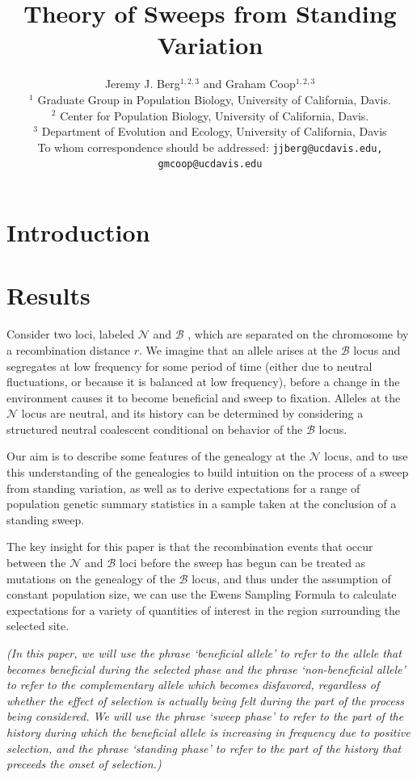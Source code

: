 \documentclass[a4paper,10pt]{article}
\title{Theory of Sweeps from Standing Variation}
\author{
Jeremy J. Berg$^{1,2,3}$ and Graham Coop$^{1,2,3}$ \\
$^1$ Graduate Group in Population Biology, University of California, Davis. \\
$^2$ Center for Population Biology, University of California, Davis.\\
$^3$ Department of Evolution and Ecology, University of California, Davis\\
\small To whom correspondence should be addressed: \texttt{jjberg@ucdavis.edu, gmcoop@ucdavis.edu}\\
}
\date{}
\newcommand{\fancyN}{$\mathcal N$ }
\newcommand{\fancyB}{$\mathcal B$ }
\newcommand{\jb}[1]{{\it\color{blue} (#1)} }
\begin{document}
\maketitle

\begin{abstract}
\end{abstract}

\section{Introduction}



\section{Results}
Consider two loci, labeled \fancyN and \fancyB, which are separated on the chromosome by a recombination distance $r$. We imagine that an allele arises at the \fancyB locus and segregates at low frequency for some period of time (either due to neutral fluctuations, or because it is balanced at low frequency), before a change in the environment causes it to become beneficial and sweep to fixation. Alleles at the \fancyN locus are neutral, and its history can be determined by considering a structured neutral coalescent conditional on behavior of the \fancyB locus.

Our aim is to describe some features of the genealogy at the \fancyN locus, and to use this understanding of the genealogies to build intuition on the process of a sweep from standing variation, as well as to derive expectations for a range of population genetic summary statistics in a sample taken at the conclusion of a standing sweep.

The key insight for this paper is that the recombination events that occur between the \fancyN and \fancyB loci before the sweep has begun can be treated as mutations on the genealogy of the \fancyB locus, and thus under the assumption of constant population size, we can use the Ewens Sampling Formula to calculate expectations for a variety of quantities of interest in the region surrounding the selected site.

\jb{In this paper, we will use the phrase `beneficial allele' to refer to the allele that becomes beneficial during the selected phase and the phrase `non-beneficial allele' to refer to the complementary allele which becomes disfavored, regardless of whether the effect of selection is actually being felt during the part of the process being considered. We will use the phrase `sweep phase' to refer to the part of the history during which the beneficial allele is increasing in frequency due to positive selection, and the phrase `standing phase' to refer to the part of the history that preceeds the onset of selection.}
\end{document}
